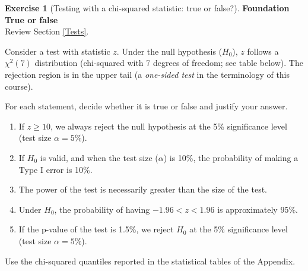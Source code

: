 \documentclass[
  11pt,
]{book}
\theoremstyle{definition}
\theoremstyle{definition}
\theoremstyle{definition}
\newtheorem{exercise}{Exercise}[chapter]
\theoremstyle{definition}
\theoremstyle{remark}
\begin{document}
\begin{exercisebox}

\begin{exercise}[Testing with a chi-squared statistic: true or false?]
\protect\hypertarget{exr:tests-chi-square-true-false}{}\label{exr:tests-chi-square-true-false}\textbf{Foundation \textbar{} True or false}\\
Review Section \ref{Tests}.

Consider a test with statistic \(z\). Under the null hypothesis (\(H_0\)), \(z\) follows a \(\chi^2(7)\) distribution (chi-squared with 7 degrees of freedom; see table below). The rejection region is in the upper tail (a \emph{one-sided test} in the terminology of this course).

For each statement, decide whether it is true or false and justify your answer.

\begin{enumerate}
\def\labelenumi{\arabic{enumi}.}
\item
  If \(z \ge 10\), we always reject the null hypothesis at the 5\% significance level (test size \(\alpha=5\%\)).
\item
  If \(H_0\) is valid, and when the test size (\(\alpha\)) is 10\%, the probability of making a Type I error is 10\%.
\item
  The power of the test is necessarily greater than the size of the test.
\item
  Under \(H_0\), the probability of having \(-1.96<z<1.96\) is approximately 95\%.
\item
  If the p-value of the test is 1.5\%, we reject \(H_0\) at the 5\% significance level (test size \(\alpha=5\%\)).
\end{enumerate}

Use the chi-squared quantiles reported in the statistical tables of the Appendix.
\end{exercise}

\end{exercisebox}

\end{document}
